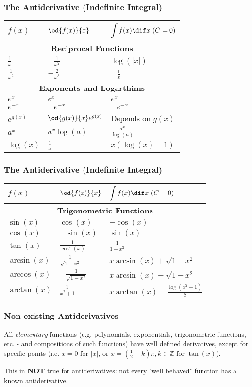\begin{frame}
	\frametitle{The Antiderivative (Indefinite Integral)}
	\centering
	\begin{tabular}{lll}
		\toprule
		$f(x)$ & $\od{f(x)}{x}$ & $\displaystyle\int f(x)\dif x\ (C=0)$\\
		\midrule
		\multicolumn{3}{c}{\textbf{Reciprocal Functions}}\\
		$\frac{1}{x}$ & $-\frac{1}{x^{2}}$ & $\log(|x|)$\\
		$\frac{1}{x^{2}}$ & $-\frac{2}{x^{3}}$ & $-\frac{1}{x}$\\
		\multicolumn{3}{c}{\textbf{Exponents and Logarthims}}\\
		$e^{x}$ & $e^{x}$ & $e^{x}$\\
		$e^{-x}$ & $-e^{-x}$ & $-e^{-x}$\\
		$e^{g(x)}$ & $\od{g(x)}{x}e^{g(x)}$ & Depends on $g(x)$\\
		$a^{x}$ & $a^{x}\log(a)$ & $\frac{a^{x}}{\log(a)}$\\
		$\log(x)$ & $\frac{1}{x}$ & $x\left( \log(x)-1 \right)$\\
		\bottomrule
	\end{tabular}
\end{frame}

\begin{frame}
	\frametitle{The Antiderivative (Indefinite Integral)}
	\centering
	\begin{tabular}{lll}
		\toprule
		$f(x)$ & $\od{f(x)}{x}$ & $\displaystyle\int f(x)\dif x\ (C=0)$\\
		\midrule
		\multicolumn{3}{c}{\textbf{Trigonometric Functions}}\\
		$\sin(x)$ & $\cos(x)$ & $-\cos(x)$\\
		$\cos(x)$ & $-\sin(x)$ & $\sin(x)$\\
		$\tan(x)$ & $\frac{1}{\cos^{2}(x)}$ & $\frac{1}{1+x^{2}}$\\
		$\arcsin(x)$ & $\frac{1}{\sqrt{1-x^{2}}}$ & $x\arcsin(x)+\sqrt{1-x^{2}}$\\
		$\arccos(x)$ & $-\frac{1}{\sqrt{1-x^{2}}}$ & $x\arcsin(x)-\sqrt{1-x^{2}}$\\
		$\arctan(x)$ & $\frac{1}{x^{2}+1}$ & $x\arctan(x)-\frac{\log(x^{2}+1)}{2}$\\
		\bottomrule
	\end{tabular}
\end{frame}

\begin{frame}
	\frametitle{Non-existing Antiderivatives}
	All \emph{elementary} functions (e.g. polynomials, exponentials, trigonometric functions, etc. - and compositions of such functions) have well defined derivatives, except for specific points (i.e. $x=0$ for $|x|$, or $x=\left(\frac{1}{2}+k\right)\pi, k\in\mathbb{Z}$ for $\tan(x)$).

	This in \textbf{NOT} true for antiderivatives: not every "well behaved" function has a known antiderivative.
\end{frame}


